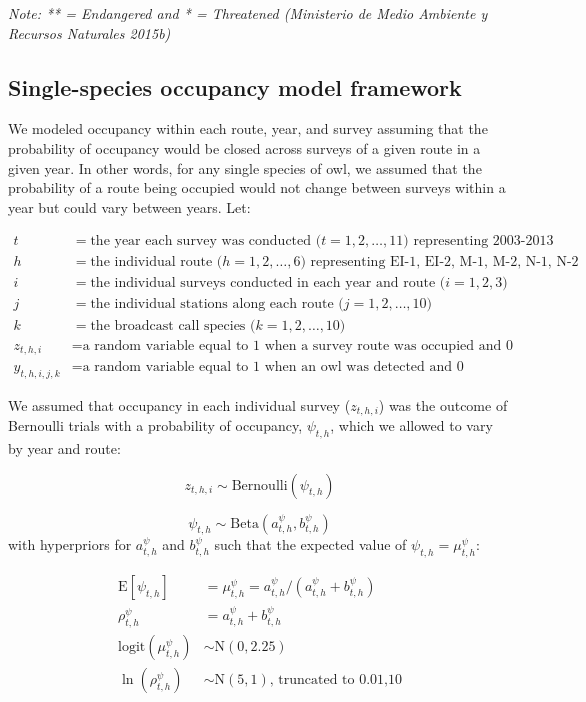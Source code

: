 \documentclass[
]{article}
\begin{document}
\emph{Note: ** = Endangered and * = Threatened (Ministerio de Medio
Ambiente y Recursos Naturales 2015b)}

\hypertarget{single-species-occupancy-model-framework}{%
\subsection{Single-species occupancy model
framework}\label{single-species-occupancy-model-framework}}

We modeled occupancy within each route, year, and survey assuming that
the probability of occupancy would be closed across surveys of a given
route in a given year. In other words, for any single species of owl, we
assumed that the probability of a route being occupied would not change
between surveys within a year but could vary between years. Let:

\[
\begin{aligned}
t  &=  \text{the year each survey was conducted (}t = 1,2,\ldots,11)\text{ representing 2003-2013}\\
h  &=  \text{the individual route (}h = 1,2,\ldots,6)\text{ representing EI-1, EI-2, M-1, M-2, N-1, N-2}\\
i  &=  \text{the individual surveys conducted in each year and route (}i = 1,2,3)\\
j  &=  \text{the individual stations along each route (}j = 1,2,\ldots,10)\\
k  &=  \text{the broadcast call species (}k = 1,2,\ldots,10)\\
z_{t,h,i} &= \text{a random variable equal to 1 when a survey route was occupied and 0 otherwise}\\
y_{t,h,i,j,k} &= \text{a random variable equal to 1 when an owl was detected and 0 otherwise}
\end{aligned}
\]

We assumed that occupancy in each individual survey (\(z_{t,h,i}\)) was
the outcome of Bernoulli trials with a probability of occupancy,
\(\psi_{t,h}\), which we allowed to vary by year and route:

\[
z_{t,h,i} \sim \text{Bernoulli}(\psi_{t,h})
\]

\[
\psi_{t,h} \sim \text{Beta}(a^\psi_{t,h},b^\psi_{t,h})
\] with hyperpriors for \(a^\psi_{t,h}\) and \(b^\psi_{t,h}\) such that
the expected value of \(\psi_{t,h} = \mu^\psi_{t,h}\):

\[
\begin{aligned}
\text{E}[\psi_{t,h}] &= \mu^\psi_{t,h} = a^\psi_{t,h}/(a^\psi_{t,h}+b^\psi_{t,h})\\
\rho^\psi_{t,h} &= a^\psi_{t,h}+b^\psi_{t,h}\\
\text{logit}(\mu^\psi_{t,h}) &\sim \text{N}(0, 2.25)\\
\ln(\rho^\psi_{t,h}) &\sim \text{N}(5,1)\text{, truncated to 0.01,10}\\
\end{aligned}
\]
\end{document}
